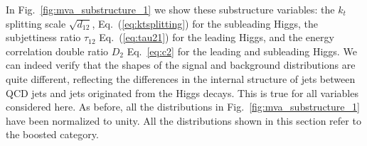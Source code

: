 In Fig.~\ref{fig:mva_substructure_1}
we show these substructure variables: the
$k_t$ splitting scale $\sqrt{d_{12}}$, Eq.~(\ref{eq:ktsplitting}) for
the subleading Higgs, the subjettiness ratio $\tau_{12}$
Eq.~(\ref{eq:tau21})
for the leading Higgs,
and the energy correlation double ratio $D_2$
Eq.~\ref{eq:c2}
for the leading and subleading Higgs.
%
We can indeed verify that the shapes of the signal
and background distributions are quite different,
reflecting the differences in the internal structure of jets
between QCD jets and jets originated from the Higgs decays.
%
This is true for all variables considered here.
%
As before, all the distributions in
Fig.~\ref{fig:mva_substructure_1}
have been normalized to unity.
%
All the distributions shown in this section refer to the boosted category.


